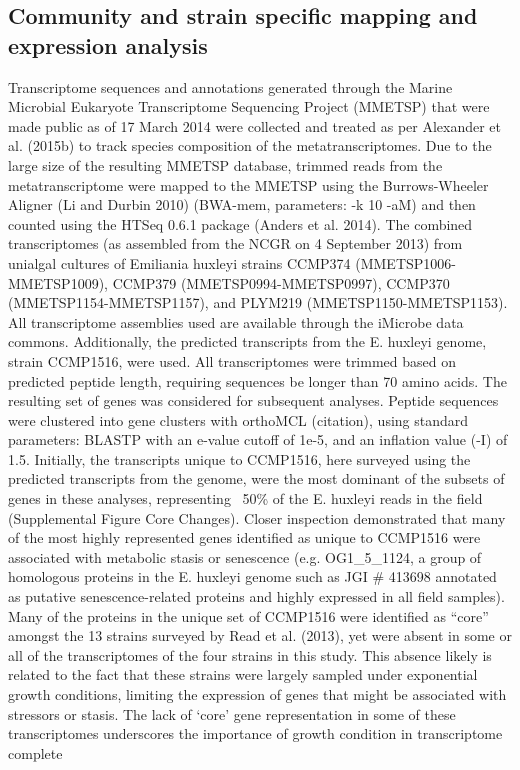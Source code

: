 \subsection{Community and strain specific mapping and expression analysis}
Transcriptome sequences and annotations generated through the Marine Microbial Eukaryote Transcriptome Sequencing Project (MMETSP) that were made public as of 17 March 2014 were collected and treated as per Alexander et al. (2015b) to track species composition of the metatranscriptomes. Due to the large size of the resulting MMETSP database, trimmed reads from the metatranscriptome were mapped to the MMETSP using the Burrows-Wheeler Aligner (Li and Durbin 2010) (BWA-mem, parameters: -k 10 -aM) and then counted using the HTSeq 0.6.1 package (Anders et al. 2014). 
The combined transcriptomes (as assembled from the NCGR on 4 September 2013) from unialgal cultures of Emiliania huxleyi strains CCMP374 (MMETSP1006-MMETSP1009), CCMP379 (MMETSP0994-MMETSP0997), CCMP370 (MMETSP1154-MMETSP1157), and PLYM219 (MMETSP1150-MMETSP1153). All transcriptome assemblies used are available through the iMicrobe data commons. Additionally, the predicted transcripts from the E. huxleyi genome, strain CCMP1516, were used. All transcriptomes were trimmed based on predicted peptide length, requiring sequences be longer than 70 amino acids. The resulting set of genes was considered for subsequent analyses. Peptide sequences were clustered into gene clusters with orthoMCL (citation), using standard parameters: BLASTP with an e-value cutoff of 1e-5, and an inflation value (-I) of 1.5. Initially, the transcripts unique to CCMP1516, here surveyed using the predicted transcripts from the genome, were the most dominant of the subsets of genes in these analyses, representing ~50\% of the E. huxleyi reads in the field (Supplemental Figure Core Changes). Closer inspection demonstrated that many of the most highly represented genes identified as unique to CCMP1516 were associated with metabolic stasis or senescence (e.g. OG1_5_1124, a group of homologous proteins in the E. huxleyi genome such as JGI # 413698 annotated as putative senescence-related proteins and highly expressed in all field samples). Many of the proteins in the unique set of CCMP1516 were identified as “core” amongst the 13 strains surveyed by Read et al. (2013), yet were absent in some or all of the transcriptomes of the four strains in this study. This absence likely is related to the fact that these strains were largely sampled under exponential growth conditions, limiting the expression of genes that might be associated with stressors or stasis. The lack of ‘core’ gene representation in some of these transcriptomes underscores the importance of growth condition in transcriptome complete
